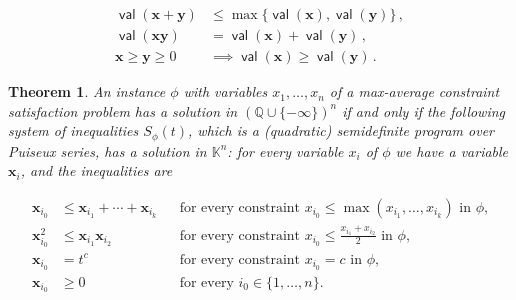 \documentclass[10pt,a4paper]{article}
\newtheorem{theorem}{Theorem}
\theoremstyle{definition}
\begin{document}
\begin{equation}\tag{2}\label{S4.E2}
\begin{aligned}
\displaystyle\operatorname*{\mathsf{val}}(\bm{x}+\bm{y}) & \displaystyle\leq\max\{\operatorname*{\mathsf{val}}(\bm{x}),\operatorname*{\mathsf{val}}(\bm{y})\}\,, \\
\displaystyle\operatorname*{\mathsf{val}}(\bm{x}\bm{y}) & \displaystyle=\operatorname*{\mathsf{val}}(\bm{x})+\operatorname*{\mathsf{val}}(\bm{y})\,, \\
\displaystyle\bm{x}\geq\bm{y}\geq 0 & \displaystyle\implies\operatorname*{\mathsf{val}}(\bm{x})\geq\operatorname*{\mathsf{val}}(\bm{y})\,.
\end{aligned}
\end{equation}

\setcounter{theorem}{5}
\begin{theorem}\label{Thmtheorem6}
An instance $\phi$ with variables $x_{1},\dots,x_{n}$ of a max-average constraint satisfaction problem has a solution in $(\mathbb{Q}\cup\{-\infty\})^{n}$ if and only if the following system of inequalities $S_{\phi}(t)$, which is a (quadratic) semidefinite program over Puiseux series, has a solution in $\mathbb{K}^{n}$: for every variable $x_{i}$ of $\phi$ we have a variable $\bm{x}_{i}$, and the inequalities are


\begin{equation}\tag{3}\label{S4.E3}
\begin{aligned}
\displaystyle\bm{x}_{i_{0}} & \displaystyle\leq\bm{x}_{i_{1}}+\cdots+\bm{x}_{i_{k}} &  & \text{for every constraint }x_{i_{0}}\leq\max(x_{i_{1}},\dots,x_{i_{k}})\text{ in }\phi\text{,} \\
\displaystyle\bm{x}^{2}_{i_{0}} & \displaystyle\leq\bm{x}_{i_{1}}\bm{x}_{i_{2}} &  & \text{for every constraint }x_{i_{0}}\leq\frac{x_{i_{1}}+x_{i_{2}}}{2}\text{ in }\phi\text{,} \\
\displaystyle\bm{x}_{i_{0}} & \displaystyle=t^{c} &  & \text{for every constraint }x_{i_{0}}=c\text{ in }\phi\text{,} \\
\displaystyle\bm{x}_{i_{0}} & \displaystyle\geq 0 &  & \text{for every }i_{0}\in\{1,\dots,n\}\text{.}
\end{aligned}
\end{equation}
\end{theorem}
\end{document}
